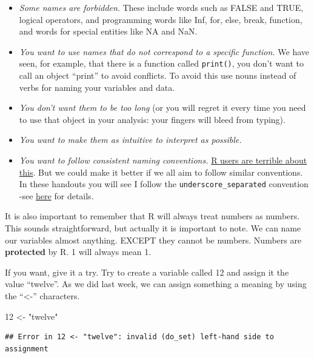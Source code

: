 \documentclass[]{book}
\newenvironment{Shaded}{\begin{snugshade}}{\end{snugshade}}
\newcommand{\DecValTok}[1]{\textcolor[rgb]{0.00,0.00,0.81}{#1}}
\newcommand{\NormalTok}[1]{#1}
\newcommand{\StringTok}[1]{\textcolor[rgb]{0.31,0.60,0.02}{#1}}
\theoremstyle{definition}
\theoremstyle{definition}
\theoremstyle{definition}
\theoremstyle{remark}
\begin{document}
\begin{itemize}
\item
  \emph{Some names are forbidden}. These include words such as FALSE and
  TRUE, logical operators, and programming words like Inf, for, else,
  break, function, and words for special entities like NA and NaN.
\item
  \emph{You want to use names that do not correspond to a specific
  function.} We have seen, for example, that there is a function called
  \texttt{print()}, you don't want to call an object ``print'' to avoid
  conflicts. To avoid this use nouns instead of verbs for naming your
  variables and data.
\item
  \emph{You don't want them to be too long} (or you will regret it every
  time you need to use that object in your analysis: your fingers will
  bleed from typing).
\item
  \emph{You want to make them as intuitive to interpret as possible.}
\item
  \emph{You want to follow consistent naming conventions.}
  \href{http://journal.r-project.org/archive/2012-2/RJournal_2012-2_Baaaath.pdf}{R
  users are terrible about this}. But we could make it better if we all
  aim to follow similar conventions. In these handouts you will see I
  follow the \texttt{underscore\_separated} convention -see
  \href{http://robinlovelace.net/r/2014/07/15/naming-conventions-r.html}{here}
  for details.
\end{itemize}

It is also important to remember that R will always treat numbers as
numbers. This sounds straightforward, but actually it is important to
note. We can name our variables almost anything. EXCEPT they cannot be
numbers. Numbers are \textbf{protected} by R. 1 will always mean 1.

If you want, give it a try. Try to create a variable called 12 and
assign it the value ``twelve''. As we did last week, we can assign
something a meaning by using the ``\textless{}-'' characters.

\begin{Shaded}
\begin{Highlighting}[]
\DecValTok{12}\NormalTok{ <-}\StringTok{ "twelve"}
\end{Highlighting}
\end{Shaded}

\begin{verbatim}
## Error in 12 <- "twelve": invalid (do_set) left-hand side to assignment
\end{verbatim}
\end{document}
